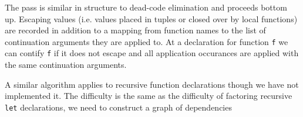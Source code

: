 \documentclass{article}
\begin{document}
The pass is similar in structure to dead-code elimination and proceeds bottom up. Escaping values (i.e. values placed in tuples or closed over by local functions) are recorded in addition to a mapping from function names to the list of continuation arguments they are applied to. At a declaration for function \lstinline!f! we can contify \lstinline!f! if it does not escape and all application occurances are applied with the same continuation arguments. 

A similar algorithm applies to recursive function declarations though we have not implemented it. The difficulty is the same as the difficulty of factoring recursive \lstinline!let! declarations, we need to construct a graph of dependencies 




\end{document}
